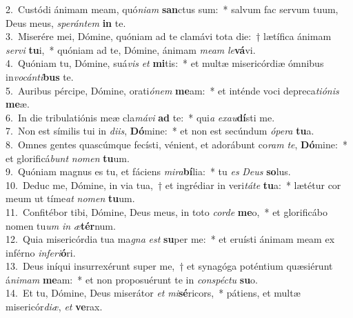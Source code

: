 {2.~}Custódi ánimam meam, quó\textit{ni}\textit{am} \textbf{san}ctus sum:~* salvum fac servum tuum, Deus meus, \textit{spe}\textit{rán}\textit{tem} \textbf{in} te.\\
{3.~}Miserére mei, Dómine, quóniam ad te clamávi tota die:~† lætífica ánimam \textit{ser}\textit{vi} \textbf{tu}i,~* quóniam ad te, Dómine, ánimam \textit{me}\textit{am} \textit{le}\textbf{vá}vi.\\
{4.~}Quóniam tu, Dómine, suá\textit{vis} \textit{et} \textbf{mi}tis:~* et multæ misericórdiæ ómnibus in\textit{vo}\textit{cán}\textit{ti}\textbf{bus} te.\\
{5.~}Auribus pércipe, Dómine, orati\textit{ó}\textit{nem} \textbf{me}am:~* et inténde voci depreca\textit{ti}\textit{ó}\textit{nis} \textbf{me}æ.\\
{6.~}In die tribulatiónis meæ cla\textit{má}\textit{vi} \textbf{ad} te:~* qui\textit{a} \textit{e}\textit{xau}\textbf{dí}sti me.\\
{7.~}Non est símilis tui in \textit{di}\textit{is}, \textbf{Dó}mine:~* et non est secúndum \textit{ó}\textit{pe}\textit{ra} \textbf{tu}a.\\
{8.~}Omnes gentes quascúmque fecísti, vénient, et adorábunt co\textit{ram} \textit{te}, \textbf{Dó}mine:~* et glorificá\textit{bunt} \textit{no}\textit{men} \textbf{tu}um.\\
{9.~}Quóniam magnus es tu, et fáciens \textit{mi}\textit{ra}\textbf{bí}lia:~* tu \textit{es} \textit{De}\textit{us} \textbf{so}lus.\\
{10.~}Deduc me, Dómine, in via tua,~† et ingrédiar in veri\textit{tá}\textit{te} \textbf{tu}a:~* lætétur cor meum ut tíme\textit{at} \textit{no}\textit{men} \textbf{tu}um.\\
{11.~}Confitébor tibi, Dómine, Deus meus, in toto \textit{cor}\textit{de} \textbf{me}o,~* et glorificábo nomen tu\textit{um} \textit{in} \textit{æ}\textbf{tér}num.\\
{12.~}Quia misericórdia tua ma\textit{gna} \textit{est} \textbf{su}per me:~* et eruísti ánimam meam ex inférno \textit{in}\textit{fe}\textit{ri}\textbf{ó}ri.\\
{13.~}Deus iníqui insurrexérunt super me,~† et synagóga poténtium quæsiérunt á\textit{ni}\textit{mam} \textbf{me}am:~* et non proposuérunt te in \textit{con}\textit{spé}\textit{ctu} \textbf{su}o.\\
{14.~}Et tu, Dómine, Deus miserátor \textit{et} \textit{mi}\textbf{sé}ricors,~* pátiens, et multæ misericór\textit{di}\textit{æ}, \textit{et} \textbf{ve}rax.\\
